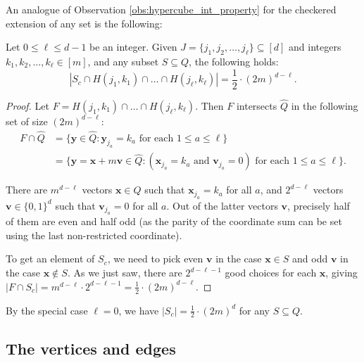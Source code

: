 \documentclass[10pt,a4paper]{article}
\numberwithin{equation}{section}
\begin{document}
An analogue of Observation \ref{obs:hypercube_int_property} for the checkered extension of any set is the following:
\begin{lemma}\label{lem:checkered_property}
Let $0\le \ell\le d-1$ be an integer. Given $J=\{j_1, j_2, \ldots, j_{\ell}\}\subseteq [d]$ and integers $k_1, k_2, \ldots, k_{\ell}\in [m]$, and any subset $S\subseteq Q$, the following holds:
$$|S_c\cap H(j_1, k_1)\cap \ldots\cap H(j_{\ell},k_{\ell})|=\frac12\cdot (2m)^{d-\ell}.$$
\end{lemma}
\begin{proof}
Let $F=H(j_1, k_1)\cap \dots\cap H(j_{\ell}, k_{\ell})$. Then $F$ intersects $\widehat{Q}$ in the following set of size $(2m)^{d-\ell}$:
\begin{equation*}
\begin{split}
F\cap \widehat{Q} &=\{\mathbf{y}\in \widehat{Q}: \mathbf{y}_{j_a}=k_a\text{ for each $1\le a\le \ell$}\} \\
&=\{\mathbf{y}=\mathbf{x}+m\mathbf{v}\in \widehat{Q}: (\mathbf{x}_{j_a}=k_a \text{ and }\mathbf{v}_{j_a}=0)\text{ for each $1\le a\le \ell$}\}.
\end{split}
\end{equation*}

There are $m^{d-\ell}$ vectors $\mathbf{x}\in Q$ such that $\mathbf{x}_{j_a}=k_a$ for all $a$, and $2^{d-\ell}$ vectors $\mathbf{v}\in \{0,1\}^d$ such that $\mathbf{v}_{j_a}=0$ for all $a$. Out of the latter vectors $\mathbf{v}$, precisely half of them are even and half odd (as the parity of the coordinate sum can be set using the last non-restricted coordinate).

To get an element of $S_c$, we need to pick even $\mathbf{v}$ in the case $\mathbf{x}\in S$ and odd $\mathbf{v}$ in the case $\mathbf{x}\not\in S$. As we just saw, there are $2^{d-\ell-1}$ good choices for each $\mathbf{x}$, giving $|F\cap S_c|=m^{d-\ell}\cdot 2^{d-\ell-1}=\frac12\cdot (2m)^{d-\ell}$.
\end{proof}

\begin{remark}\label{rem:checkered_property_0}
By the special case $\ell=0$, we have $|S_c|=\frac12\cdot (2m)^d$ for any $S\subseteq Q$.
\end{remark}

\subsection{The vertices and edges}\label{subsec:vertex_labellings}
\end{document}
